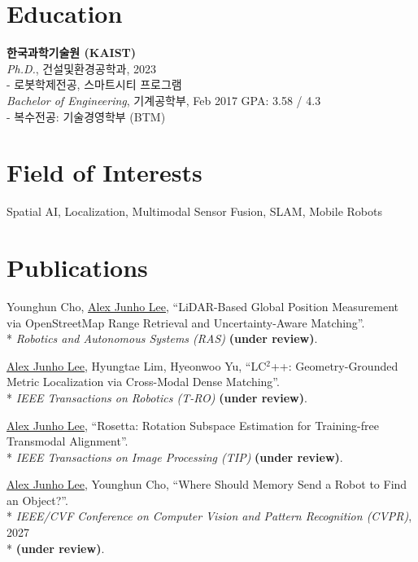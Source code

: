 \documentclass[margin]{res}
\newcommand{\cvbodyfont}{\fontsize{9.5pt}{11.4pt}\selectfont}
\begin{document}
	\begin{resume}
		\cvbodyfont
		\raggedright
		
		\section{Education}
		\textbf{한국과학기술원 (KAIST)}\\
		{\sl Ph.D.}, 건설및환경공학과, 2023
		\\- 로봇학제전공, 스마트시티 프로그램
		\\
		{\sl Bachelor of Engineering}, 기계공학부, Feb 2017
		\hfill GPA: 3.58 / 4.3
		\\- 복수전공: 기술경영학부 (BTM)
				
		\section{Field of Interests}
		Spatial AI, Localization, Multimodal Sensor Fusion, SLAM, Mobile Robots

		\section{Publications}
		\par Younghun Cho, \underline{Alex Junho Lee}, ``LiDAR-Based Global Position Measurement via OpenStreetMap Range Retrieval and Uncertainty-Aware Matching''.\\*
		\textit{Robotics and Autonomous Systems (RAS)} \textbf{(under review)}.

		\par \underline{Alex Junho Lee}, Hyungtae Lim, Hyeonwoo Yu, ``LC$^2$++: Geometry-Grounded Metric Localization via Cross-Modal Dense Matching''.\\*
		\textit{IEEE Transactions on Robotics (T-RO)} \textbf{(under review)}.

		\par \underline{Alex Junho Lee}, ``Rosetta: Rotation Subspace Estimation for Training-free Transmodal Alignment''.\\*
		\textit{IEEE Transactions on Image Processing (TIP)} \textbf{(under review)}.

		\par \underline{Alex Junho Lee}, Younghun Cho, ``Where Should Memory Send a Robot to Find an Object?''.\\*
		\textit{IEEE/CVF Conference on Computer Vision and Pattern Recognition (CVPR)}, 2027\\*
		\textbf{(under review)}.


\end{resume}
\end{document}
